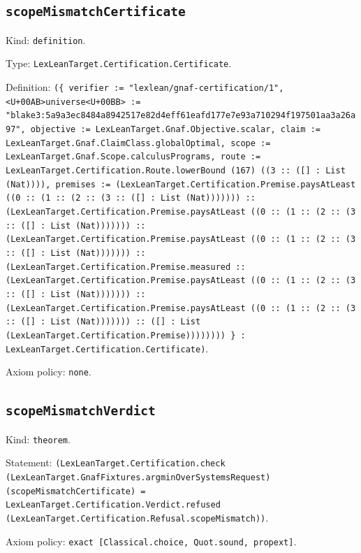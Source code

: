\documentclass[11pt]{article}
\begin{document}
\subsection*{\texttt{scopeMismatchCertificate}}
\noindent Kind: \texttt{definition}.\par
\noindent Type: \texttt{LexLeanTarget.Certification.Certificate}.\par
\noindent Definition: \texttt{(\{ verifier := "lexlean/gnaf-certification/1", <U+00AB>universe<U+00BB> := "blake3:5a9a3ec8484a8942517e82d4eff61eafd177e7e93a710294f197501aa3a26a97", objective := LexLeanTarget.Gnaf.Objective.scalar, claim := LexLeanTarget.Gnaf.ClaimClass.globalOptimal, scope := LexLeanTarget.Gnaf.Scope.calculusPrograms, route := LexLeanTarget.Certification.Route.lowerBound (167) ((3 :: ([] : List (Nat)))), premises := (LexLeanTarget.Certification.Premise.paysAtLeast ((0 :: (1 :: (2 :: (3 :: ([] : List (Nat))))))) :: (LexLeanTarget.Certification.Premise.paysAtLeast ((0 :: (1 :: (2 :: (3 :: ([] : List (Nat))))))) :: (LexLeanTarget.Certification.Premise.paysAtLeast ((0 :: (1 :: (2 :: (3 :: ([] : List (Nat))))))) :: (LexLeanTarget.Certification.Premise.measured :: (LexLeanTarget.Certification.Premise.paysAtLeast ((0 :: (1 :: (2 :: (3 :: ([] : List (Nat))))))) :: (LexLeanTarget.Certification.Premise.paysAtLeast ((0 :: (1 :: (2 :: (3 :: ([] : List (Nat))))))) :: ([] : List (LexLeanTarget.Certification.Premise)))))))) \} : LexLeanTarget.Certification.Certificate)}.\par
\noindent Axiom policy: \texttt{none}.\par
\subsection*{\texttt{scopeMismatchVerdict}}
\noindent Kind: \texttt{theorem}.\par
\noindent Statement: \texttt{(LexLeanTarget.Certification.check (LexLeanTarget.GnafFixtures.argminOverSystemsRequest) (scopeMismatchCertificate) = LexLeanTarget.Certification.Verdict.refused (LexLeanTarget.Certification.Refusal.scopeMismatch))}.\par
\noindent Axiom policy: \texttt{exact [Classical.choice, Quot.sound, propext]}.\par
\end{document}
